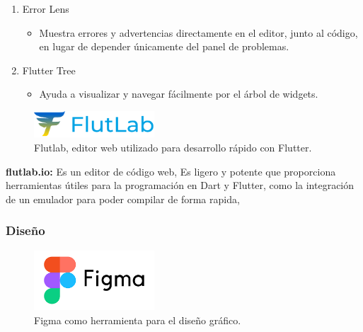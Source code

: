 \documentclass{article}
\begin{document}
\begin{flushleft}
\begin{enumerate}
        
        \item Error Lens

        \begin{itemize}
            \item Muestra errores y advertencias directamente en el editor, junto al código, en lugar de depender únicamente del panel de problemas.
        \end{itemize}


        \item Flutter Tree

        
        \begin{itemize}
            \item Ayuda a visualizar y navegar fácilmente por el árbol de widgets.
        \end{itemize}
\end{enumerate}


\begin{figure}[H]
    \centering
    \includegraphics[width=0.4\textwidth]{TFG/img/logo.png}
    \caption{Flutlab, editor web utilizado para desarrollo rápido con Flutter.}
    \label{fig:flutlab}
\end{figure}

\textbf{flutlab.io:}    
    Es un editor de código web, Es ligero y potente que proporciona herramientas útiles para la programación en Dart y Flutter, como la integración de un emulador para poder compilar de forma rapida,\\


\subsubsection{Diseño}

\begin{figure}[H]
    \centering
    \includegraphics[width=0.4\textwidth]{TFG/img/figma.png}
    \caption{Figma como herramienta para el diseño gráfico.}
    \label{fig:figma}
\end{figure}



\end{flushleft}
\end{document}
